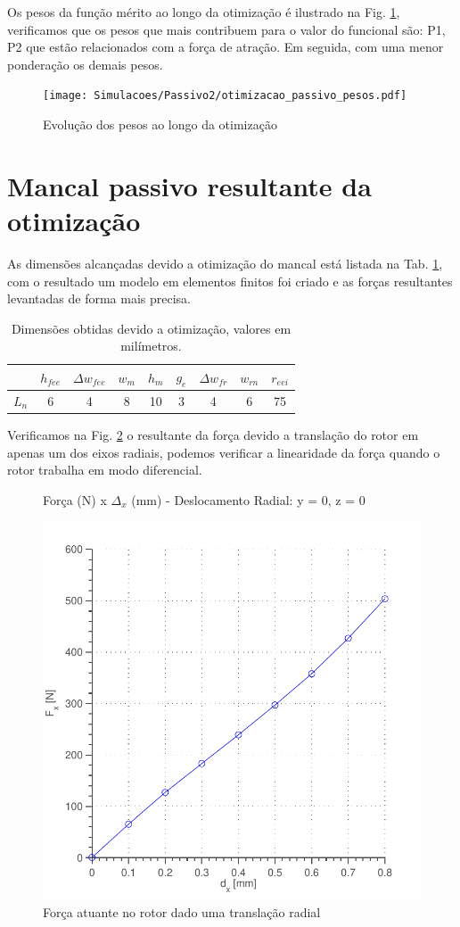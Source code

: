 Os pesos da função mérito ao longo da otimização é ilustrado na Fig. \ref{fig:otimizacao_passivo_pesos}, verificamos que os pesos que mais contribuem para o valor do funcional são: P1, P2 que estão relacionados com a força de atração. Em seguida, com uma menor ponderação os demais pesos. 

\begin{figure}[th!]
	\centering
	\texttt{[image: Simulacoes/Passivo2/otimizacao\_passivo\_pesos.pdf]}
	\caption{Evolução dos pesos ao longo da otimização}
	\label{fig:otimizacao_passivo_pesos}
\end{figure} 



\section{Mancal passivo resultante da otimização}

As dimensões alcançadas devido a otimização do mancal está listada na Tab. \ref{tab:passivo:dimensoes:otimizado}, com o resultado um modelo em elementos finitos foi criado e as forças resultantes levantadas de forma mais precisa.

\begin{table}[ht!]
	\centering
	\begin{tabular}{c c c c c c c c c}
		& $h_{fee}$ &$\Delta w_{fee}$ & $w_m$ & $h_m$  & $g_e$ & $\Delta w_{fr}$ & $w_{rn}$ & $r_{eei}$ \\ \hline \hline
		$L_{n}$  	&  6 &   4 &    8 &    10 &   3 &  4 &   6 &    75 \\
	\end{tabular} 
	\caption{Dimensões obtidas devido a otimização, valores em milímetros.}
	\label{tab:passivo:dimensoes:otimizado} 
\end{table} 

Verificamos na Fig. \ref{fig:forca:passivo:otimizado:fem:dx} o resultante  da força devido a  translação do rotor em apenas um dos eixos radiais, podemos verificar a linearidade da força quando o rotor trabalha em modo diferencial.  

\begin{figure}[!ht]
\centering
\caption*{Força (N) x $\Delta_x$ (mm) - Deslocamento Radial: y = 0, z = 0}
\includegraphics[width=0.6 \columnwidth,angle=0]{Figs/Simulacoes/Passivo2/fem/passivo_otimizado_fem_dx}
\caption{Força atuante no rotor dado uma translação radial}
\label{fig:forca:passivo:otimizado:fem:dx}
\end{figure} 

